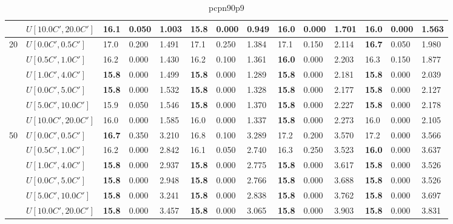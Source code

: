 \begin{table}[h]
{\begin{tabular}{|l|l||l|l|l||l|l|l||l|l|l||l|l|l|}
       & $U[10.0C',20.0C']$ & 16.1 & 0.050 & 1.003 & \textbf{15.8} & 0.000 & 0.949 & 16.0 & 0.000 & 1.701 & 16.0 & 0.000 & 1.563 \\
      \hline\hline
      \multirow{6}{*}{20} & $U[0.0C',0.5C']$ & 17.0 & 0.200 & 1.491 & 17.1 & 0.250 & 1.384 & 17.1 & 0.150 & 2.114 & \textbf{16.7} & 0.050 & 1.980 \\
       & $U[0.5C',1.0C']$ & 16.2 & 0.000 & 1.430 & 16.2 & 0.100 & 1.361 & \textbf{16.0} & 0.000 & 2.203 & 16.3 & 0.150 & 1.877 \\
       & $U[1.0C',4.0C']$ & \textbf{15.8} & 0.000 & 1.499 & \textbf{15.8} & 0.000 & 1.289 & \textbf{15.8} & 0.000 & 2.181 & \textbf{15.8} & 0.000 & 2.039 \\
       & $U[0.0C',5.0C']$ & \textbf{15.8} & 0.000 & 1.532 & \textbf{15.8} & 0.000 & 1.328 & \textbf{15.8} & 0.000 & 2.177 & \textbf{15.8} & 0.000 & 2.127 \\
       & $U[5.0C',10.0C']$ & 15.9 & 0.050 & 1.546 & \textbf{15.8} & 0.000 & 1.370 & \textbf{15.8} & 0.000 & 2.227 & \textbf{15.8} & 0.000 & 2.178 \\
       & $U[10.0C',20.0C']$ & 16.0 & 0.000 & 1.585 & 16.0 & 0.000 & 1.337 & \textbf{15.8} & 0.000 & 2.273 & 16.0 & 0.000 & 2.105 \\
      \hline\hline
      \multirow{6}{*}{50} & $U[0.0C',0.5C']$ & \textbf{16.7} & 0.350 & 3.210 & 16.8 & 0.100 & 3.289 & 17.2 & 0.200 & 3.570 & 17.2 & 0.000 & 3.566 \\
       & $U[0.5C',1.0C']$ & 16.2 & 0.000 & 2.842 & 16.1 & 0.050 & 2.740 & 16.3 & 0.250 & 3.523 & \textbf{16.0} & 0.000 & 3.637 \\
       & $U[1.0C',4.0C']$ & \textbf{15.8} & 0.000 & 2.937 & \textbf{15.8} & 0.000 & 2.775 & \textbf{15.8} & 0.000 & 3.617 & \textbf{15.8} & 0.000 & 3.526 \\
       & $U[0.0C',5.0C']$ & \textbf{15.8} & 0.000 & 2.948 & \textbf{15.8} & 0.000 & 2.766 & \textbf{15.8} & 0.000 & 3.688 & \textbf{15.8} & 0.000 & 3.526 \\
       & $U[5.0C',10.0C']$ & \textbf{15.8} & 0.000 & 3.241 & \textbf{15.8} & 0.000 & 2.838 & \textbf{15.8} & 0.000 & 3.762 & \textbf{15.8} & 0.000 & 3.697 \\
       & $U[10.0C',20.0C']$ & \textbf{15.8} & 0.000 & 3.457 & \textbf{15.8} & 0.000 & 3.065 & \textbf{15.8} & 0.000 & 3.903 & \textbf{15.8} & 0.000 & 3.831 \\
      \hline
      \end{tabular}
      }
      \caption{pcpn90p9}
      \label{tab:pcpn90p9ILPVariant}\end{table}
      
